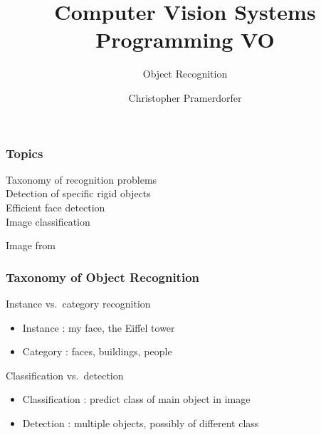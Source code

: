 \documentclass[xetex,professionalfont]{beamer}
\title{Computer Vision Systems Programming VO}
\subtitle{Object Recognition}
\author{Christopher Pramerdorfer}
\institute{Computer Vision Lab, Vienna University of Technology}
\begin{document}

\begin{frame}
\maketitle
\end{frame}


\begin{frame}
\frametitle{Topics}

Taxonomy of recognition problems\\\medskip
Detection of specific rigid objects\\\medskip
Efficient face detection\\\medskip
Image classification

\begin{center}
    {\centering Image from \cite{grauman2011}}
\end{center}

\end{frame}


\begin{frame}
\frametitle{Taxonomy of Object Recognition}

Instance vs.\ category recognition
\begin{itemize}
    \item Instance : my face, the Eiffel tower
    \item Category : faces, buildings, people
\end{itemize}

\bigskip
Classification vs.\ detection
\begin{itemize}
    \item Classification : predict class of main object in image
    \item Detection : multiple objects, possibly of different class %
\end{itemize}

\end{frame}
\end{document}
